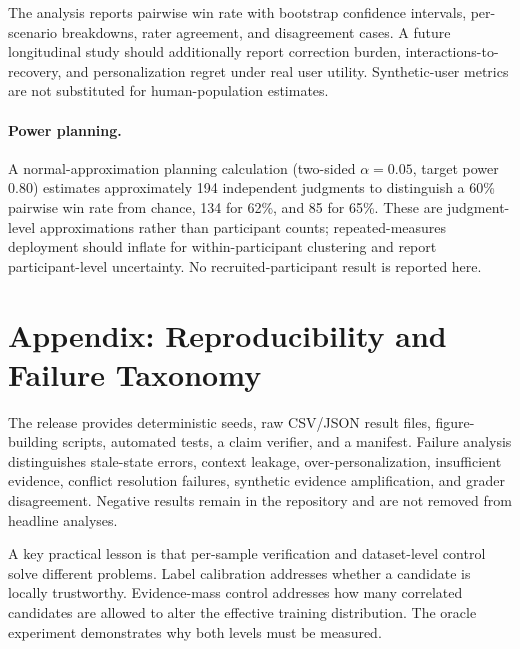 \documentclass[10pt,twocolumn]{article}
\begin{document}
The analysis reports pairwise win rate with bootstrap confidence intervals, per-scenario breakdowns, rater agreement, and disagreement cases. A future longitudinal study should additionally report correction burden, interactions-to-recovery, and personalization regret under real user utility. Synthetic-user metrics are not substituted for human-population estimates.

\paragraph{Power planning.} A normal-approximation planning calculation (two-sided $\alpha=0.05$, target power 0.80) estimates approximately 194 independent judgments to distinguish a 60\% pairwise win rate from chance, 134 for 62\%, and 85 for 65\%. These are judgment-level approximations rather than participant counts; repeated-measures deployment should inflate for within-participant clustering and report participant-level uncertainty. No recruited-participant result is reported here.

\section{Appendix: Reproducibility and Failure Taxonomy}
The release provides deterministic seeds, raw CSV/JSON result files, figure-building scripts, automated tests, a claim verifier, and a manifest. Failure analysis distinguishes stale-state errors, context leakage, over-personalization, insufficient evidence, conflict resolution failures, synthetic evidence amplification, and grader disagreement. Negative results remain in the repository and are not removed from headline analyses.

A key practical lesson is that per-sample verification and dataset-level control solve different problems. Label calibration addresses whether a candidate is locally trustworthy. Evidence-mass control addresses how many correlated candidates are allowed to alter the effective training distribution. The oracle experiment demonstrates why both levels must be measured.
\end{document}
